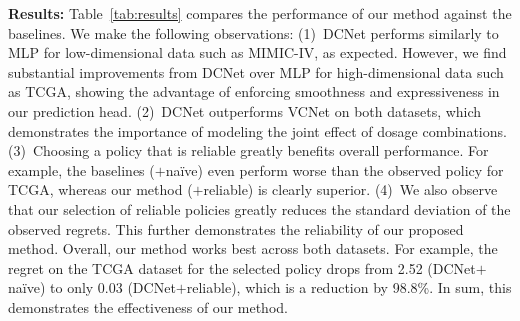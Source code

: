 \documentclass{article}
\theoremstyle{definition}
\theoremstyle{plain}
\begin{document}
\textbf{Results:} Table~\ref{tab:results} compares the performance of our method against the baselines. We make the following observations: (1)~DCNet performs similarly to MLP for low-dimensional data such as MIMIC-IV, as expected. However, we find substantial improvements from DCNet over MLP for high-dimensional data such as TCGA, showing the advantage of enforcing smoothness and expressiveness in our prediction head. (2)~DCNet outperforms VCNet on both datasets, which demonstrates the importance of modeling the joint effect of dosage combinations. (3)~Choosing a policy that is reliable greatly benefits overall performance. For example, the baselines ($+$na{\"i}ve) even perform worse than the observed policy for TCGA, whereas our method ($+$reliable) is clearly superior. (4)~We also observe that our selection of reliable policies greatly reduces the standard deviation of the observed regrets. This further demonstrates the reliability of our proposed method. Overall, our method works best across both datasets. For example, the regret on the TCGA dataset for the selected policy drops from 2.52 (DCNet$+$na{\"i}ve) to only 0.03 (DCNet$+$reliable), which is a reduction by 98.8\%. In sum, this demonstrates the effectiveness of our method. 
\end{document}

